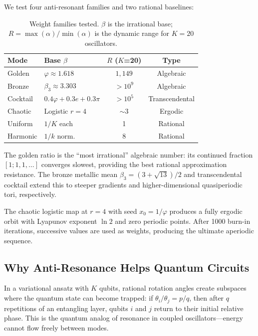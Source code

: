 \documentclass[twocolumn,showpacs,preprintnumbers,amsmath,amssymb,aps,prl]{revtex4-2}
\begin{document}
We test four anti-resonant families and two rational baselines:

\begin{table}[h]
\centering
\caption{Weight families tested. $\beta$ is the irrational base; $R = \max(\alpha)/\min(\alpha)$ is the dynamic range for $K\!=\!20$ oscillators.}
\label{tab:weights}
\begin{tabular}{llcc}
\toprule
\textbf{Mode} & \textbf{Base $\beta$} & \textbf{$R$ ($K$=20)} & \textbf{Type} \\
\midrule
Golden & $\varphi \approx 1.618$ & $1{,}149$ & Algebraic \\
Bronze & $\beta_3 \approx 3.303$ & $>10^9$ & Algebraic \\
Cocktail & $0.4\varphi+0.3e+0.3\pi$ & $>10^5$ & Transcendental \\
Chaotic & Logistic $r\!=\!4$ & $\sim 3$ & Ergodic \\
\midrule
Uniform & $1/K$ each & 1 & Rational \\
Harmonic & $1/k$ norm. & 8 & Rational \\
\bottomrule
\end{tabular}
\end{table}

The golden ratio is the ``most irrational'' algebraic number: its continued fraction $[1;1,1,\ldots]$ converges slowest, providing the best rational approximation resistance. The bronze metallic mean $\beta_3 = (3+\sqrt{13})/2$ and transcendental cocktail extend this to steeper gradients and higher-dimensional quasiperiodic tori, respectively.

The chaotic logistic map at $r=4$ with seed $x_0 = 1/\varphi$ produces a fully ergodic orbit with Lyapunov exponent $\ln 2$ and zero periodic points. After 1000 burn-in iterations, successive values are used as weights, producing the ultimate aperiodic sequence.

\subsection{Why Anti-Resonance Helps Quantum Circuits}

In a variational ansatz with $K$ qubits, rational rotation angles create subspaces where the quantum state can become trapped: if $\theta_i/\theta_j = p/q$, then after $q$ repetitions of an entangling layer, qubits $i$ and $j$ return to their initial relative phase. This is the quantum analog of resonance in coupled oscillators---energy cannot flow freely between modes.
\end{document}
